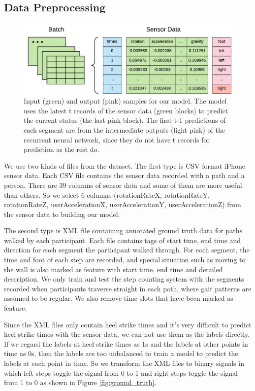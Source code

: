 \documentclass[11pt]{article}
\begin{document}
{\subsection{Data Preprocessing}

\begin{figure}[ht]
\centering
\includegraphics[scale=1]{input2}
\caption{Input (green) and output (pink) samples for our model. The model uses the latest t records of the sensor data (green blocks) to predict the current status (the last pink block). The first t-1 predictions of each segment are from the intermediate outputs (light pink) of the recurrent neural network, since they do not have t records for prediction as the rest do.}
\label{fig:batch_sensor_data}
\end{figure}

We use two kinds of files from the dataset. The first type is CSV format iPhone sensor data.  Each CSV file contains the sensor data recorded with a path and a person. There are 39 columns of sensor data and some of them are more useful than others. So we select 6 columns (rotationRateX, rotationRateY, rotationRateZ,  userAccelerationX, userAccelerationY, userAccelerationZ) from the sensor data to building our model. 

The second type is XML file containing annotated ground truth data for paths walked by each participant. Each file contains tags of start time, end time and direction for each segment the participant walked through. For each segment, the time and foot of each step are recorded, and special situation such as moving to the wall is also marked as feature with start time, end time and detailed description. We only train and test the step counting system with the segments recorded when participants traverse straight in each path, where gait patterns are assumed to be regular. We also remove time slots that have been marked as feature. 

Since the XML files only contain heel strike times and it's very difficult to predict heel strike times with the sensor data, we can not use them as the labels directly. If we regard the labels at heel strike times as 1s and the labels at other points in time as 0s, then the labels are too unbalanced to train a model to predict the labels at each point in time. So we transform the XML files to binary signals in which left steps toggle the signal from 0 to 1 and right steps toggle the signal from 1 to 0 as shown in Figure \ref{fig:ground_truth}.

}
\end{document}
